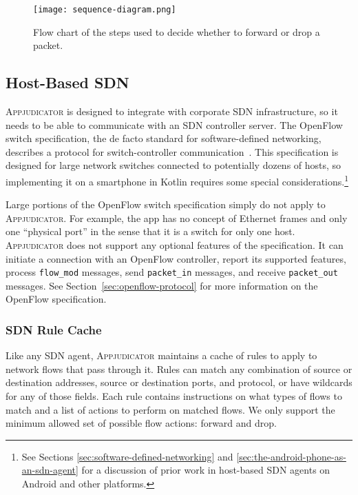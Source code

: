 
\begin{figure}[p]
    \centering
    \texttt{[image: sequence-diagram.png]}
    \caption{Flow chart of the steps used to decide whether to forward or drop a
		packet.}
	\label{fig:packet-flow-chart}
\end{figure}


\subsection{Host-Based SDN}
\label{sec:host-based-sdn}

\textsc{Appjudicator} is designed to integrate with corporate SDN
infrastructure, so it needs to be able to communicate with an SDN controller
server. The OpenFlow switch specification, the de facto standard for
software-defined networking, describes a protocol for switch-controller
communication~\cite{openflowspec}. This specification is designed for large
network switches connected to potentially dozens of hosts, so implementing it on
a smartphone in Kotlin requires some special considerations.\footnote{See
Sections \ref{sec:software-defined-networking} and
\ref{sec:the-android-phone-as-an-sdn-agent} for a discussion of prior work in
host-based SDN agents on Android and other platforms.}

Large portions of the OpenFlow switch specification simply do not apply to
\textsc{Appjudicator}. For example, the app has no concept of Ethernet frames
and only one ``physical port'' in the sense that it is a switch for only one
host. \textsc{Appjudicator} does not support any optional features of the
specification. It can initiate a connection with an OpenFlow controller, report
its supported features, process \texttt{flow\_mod} messages, send
\texttt{packet\_in} messages, and receive \texttt{packet\_out} messages. See
Section~\ref{sec:openflow-protocol} for more information on the OpenFlow
specification.

\subsubsection{SDN Rule Cache}
\label{sec:implementation-sdn-rule-cache}

Like any SDN agent, \textsc{Appjudicator} maintains a cache of rules to apply to
network flows that pass through it. Rules can match any combination of source or
destination addresses, source or destination ports, and protocol, or have
wildcards for any of those fields. Each rule contains instructions on what types
of flows to match and a list of actions to perform on matched flows. We only
support the minimum allowed set of possible flow actions: forward and drop.

